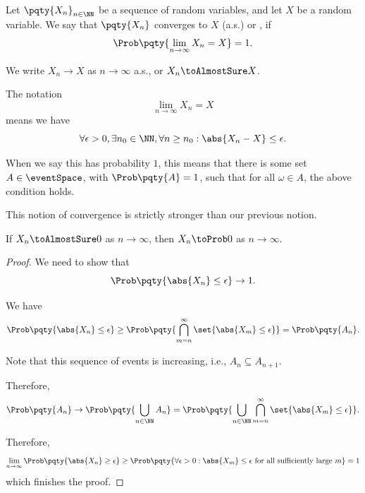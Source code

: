 \begin{definition}
    \label{def:almost-sure-convergence}%
    Let \(\pqty{X_n}_{n \in \NN}\) be a sequence of random variables, and let \(X\) be a random variable. We say that \(\pqty{X_n}\) converges to \(X\)  (a.s.) or , if
    \[
        \Prob\pqty{\lim_{n \to \infty} X_n = X} = 1.
    \]

    We write \(X_n \to X\) as \(n \to \infty\) a.s., or \(X_n \toAlmostSure X\).
\end{definition}

\begin{remark}
    The notation
    \[
        \lim_{n \to \infty} X_n = X
    \]
    means we have
    \[
        \forall \epsilon > 0, \exists n_0 \in \NN, \forall n \geq n_0: \abs{X_n - X} \leq \epsilon.
    \]

    When we say this has probability \(1\), this means that there is some set \(A \in \eventSpace\), with \(\Prob\pqty{A} = 1\), such that for all \(\omega \in A\), the above condition holds.
\end{remark}

This notion of convergence is strictly stronger than our previous notion.

\begin{claim}
    \label{claim:almost-sure-convergence-implies-convergence-in-probability}%
    If \(X_n \toAlmostSure 0\) as \(n \to \infty\), then \(X_n \toProb 0\) as \(n \to \infty\).
\end{claim}

\begin{proof}
    We need to show that
    \[
        \Prob\pqty{\abs{X_n} \leq \epsilon} \to 1.
    \]

    We have
    \[
        \Prob\pqty{\abs{X_n} \leq \epsilon} \geq \Prob\pqty{\bigcap_{m = n}^{\infty} \set{\abs{X_m} \leq \epsilon}} = \Prob\pqty{A_n}.
    \]

    Note that this sequence of events is increasing, i.e., \(A_n \subseteq A_{n + 1}\).

    Therefore,
    \[
        \Prob\pqty{A_n} \to \Prob\pqty{\bigcup_{n \in \NN} A_n} = \Prob\pqty{\bigcup_{n \in \NN} \bigcap_{m = n}^{\infty} \set{\abs{X_m} \leq \epsilon}}.
    \]  

    Therefore,
    \[
        \lim_{n \to \infty} \Prob\pqty{\abs{X_n} \geq \epsilon} \geq \Prob\pqty{\forall \epsilon > 0: \abs{X_m} \leq \epsilon \text{ for all sufficiently large }m} = 1
    \]
    which finishes the proof.
\end{proof}

